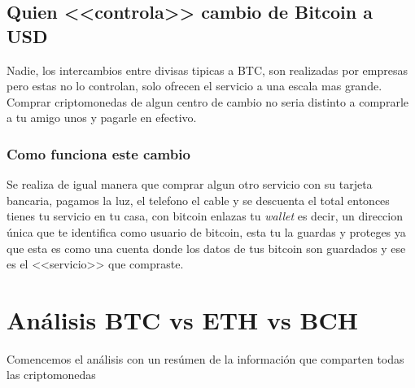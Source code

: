 \documentclass[12pt,letterpaper]{article}
\begin{document}
	\subsection*{Quien <<controla>> cambio de Bitcoin a USD}
	Nadie, los intercambios entre divisas tipicas a BTC, son realizadas por empresas pero estas no lo controlan, solo ofrecen el servicio a una escala mas grande. Comprar criptomonedas de algun centro de cambio no seria distinto a comprarle a tu amigo unos y pagarle en efectivo.

		\subsubsection*{Como funciona este cambio}
        Se realiza de igual manera que comprar algun otro servicio con su tarjeta bancaria, pagamos la luz, el telefono el cable y se descuenta el total entonces tienes tu servicio en tu casa, con bitcoin enlazas tu \textit{wallet} es decir, un direccion \'unica que te identifica como usuario de bitcoin, esta tu la guardas y proteges ya que esta es como una cuenta donde los datos de tus bitcoin son guardados y ese es el <<servicio>> que compraste.












\section{An\'alisis BTC vs ETH vs BCH}

    Comencemos el an\'alisis con un res\'umen de la informaci\'on que comparten todas las criptomonedas
\end{document}
